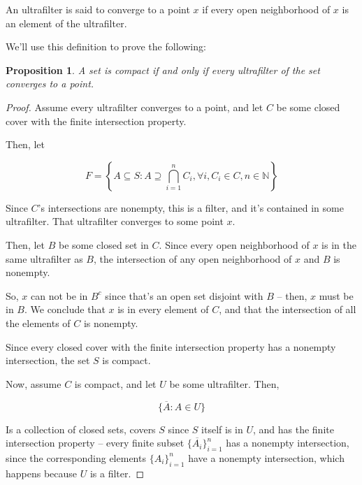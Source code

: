 \documentclass{article}
\newtheorem*{proposition}{Proposition}
\begin{document}
        An ultrafilter is said to converge to a point $x$ if every open
        neighborhood of $x$ is an element of the ultrafilter.

        We'll use this definition to prove the following:

        \begin{proposition}
        A set is compact if and only if every ultrafilter of the
        set converges to a point.
        \end{proposition}

        \begin{proof}

          Assume every ultrafilter converges to a point, and let $C$ be some
          closed cover with the finite intersection property.

          Then, let

          \[F = \left\{A \subseteq S: A \supseteq \bigcap_{i=1}^n C_i, \forall
          i, C_i \in C, n
          \in \mathbb{N}\right\}\]

          Since $C$'s intersections are nonempty, this is a filter, and it's
          contained in some ultrafilter. That ultrafilter converges to some
          point $x$.

          Then, let $B$ be some closed set in $C$. Since every open neighborhood
          of $x$ is in the same ultrafilter as $B$, the intersection of any open
          neighborhood of $x$ and $B$ is nonempty.

          So, $x$ can not be in $B^c$ since that's an open set disjoint with
          $B$ -- then, $x$ must be in $B$. We conclude that $x$ is in every
          element of $C$, and that the intersection of all the elements of $C$
          is nonempty.

          Since every closed cover with the finite intersection property has a
          nonempty intersection, the set $S$ is compact.

          Now, assume $C$ is compact, and let $U$ be some ultrafilter. Then,

          \[\{\overline{A}: A \in U\}\]

          Is a collection of closed sets, covers $S$ since $S$ itself is in $U$,
          and has the finite intersection property -- every finite subset
          $\{\overline{A_i}\}_{i=1}^n$ has a nonempty intersection, since the
          corresponding elements $\{A_i\}_{i=1}^n$ have a nonempty intersection,
          which happens because $U$ is a filter.


\end{proof}
\end{document}
